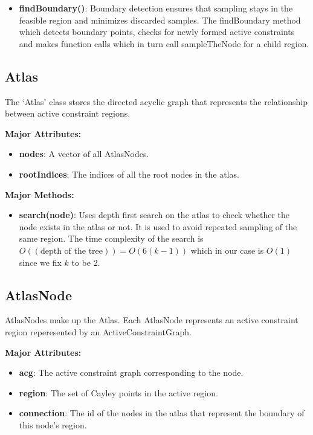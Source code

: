 \begin{itemize}
		\item  \textbf{findBoundary()}: Boundary detection ensures that sampling 
				stays in the feasible region and minimizes discarded samples. 
				The findBoundary method which detects boundary points, checks 
				for newly formed active constraints and makes function calls
				which in turn call sampleTheNode for a child region.
		
\end{itemize}

\subsection{Atlas} 
The `Atlas' class stores the directed acyclic graph that represents the relationship between active constraint regions.

\noindent \textbf{Major Attributes:}
\begin{itemize}
		\item \textbf{nodes}: A vector of all AtlasNodes. 
		\item \textbf{rootIndices}: The indices of all the root nodes in the atlas.
\end{itemize}

\noindent \textbf{Major Methods:}
\begin{itemize}
		\item \textbf{search(node)}: Uses depth first search on the atlas to check
				whether the node exists in the atlas or not. It is used to avoid
				repeated sampling of the same region. The time complexity of
				the search is $O((\text{depth of the tree})) = O(6(k-1)) $ which in our 
				case is $O(1)$ since we fix $k$ to be 2.
\end{itemize}


\subsection{AtlasNode} 
AtlasNodes make up the Atlas. Each AtlasNode represents an active constraint region
reperesented by an ActiveConstraintGraph.

\noindent \textbf{Major Attributes:}
\begin{itemize}
		\item \textbf{acg}: The active constraint graph corresponding to the node.
		\item \textbf{region}: The set of Cayley points in the active region.
		\item \textbf{connection}: The id of the nodes in the atlas that
				represent the boundary of this node's region.
\end{itemize}

